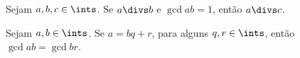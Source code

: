 \begin{exercise}
    Sejam $a, b, c \in \ints$. Se $a \divs b$ e $\gcd a b = 1$, então $a \divs
    c$.
\end{exercise}

\begin{exercise}
    Sejam $a, b \in \ints$. Se $a = bq + r$, para alguns $q, r \in \ints$, então
    $\gcd a b = \gcd b r$.
\end{exercise}
